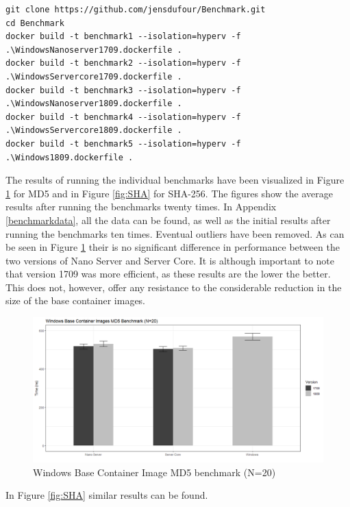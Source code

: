 \begin{lstlisting}[breaklines]
git clone https://github.com/jensdufour/Benchmark.git
cd Benchmark	
docker build -t benchmark1 --isolation=hyperv -f .\WindowsNanoserver1709.dockerfile .
docker build -t benchmark2 --isolation=hyperv -f .\WindowsServercore1709.dockerfile .
docker build -t benchmark3 --isolation=hyperv -f .\WindowsNanoserver1809.dockerfile .
docker build -t benchmark4 --isolation=hyperv -f .\WindowsServercore1809.dockerfile .
docker build -t benchmark5 --isolation=hyperv -f .\Windows1809.dockerfile .
\end{lstlisting}

The results of running the individual benchmarks have been visualized in Figure \ref{fig:MD5} for MD5 and in Figure \ref{fig:SHA} for SHA-256. The figures show the average results after running the benchmarks twenty times. In Appendix \ref{benchmarkdata}, all the data can be found, as well as the initial results after running the benchmarks ten times. Eventual outliers have been removed. 
As can be seen in Figure \ref{fig:MD5} their is no significant difference in performance between the two versions of Nano Server and Server Core. It is although important to note that version 1709 was more efficient, as these results are the lower the better. This does not, however, offer any resistance to the considerable reduction in the size of the base container images. 

\begin{figure}[h]
	\captionsetup{width=0.8\linewidth}
	\includegraphics[width=0.9\linewidth]{img/Methodologie/Containers1.png}
	\centering
	\caption[MD5 benchmark]{Windows Base Container Image MD5 benchmark (N=20)}
	\label{fig:MD5}
\end{figure}

In Figure \ref{fig:SHA} similar results can be found. 

